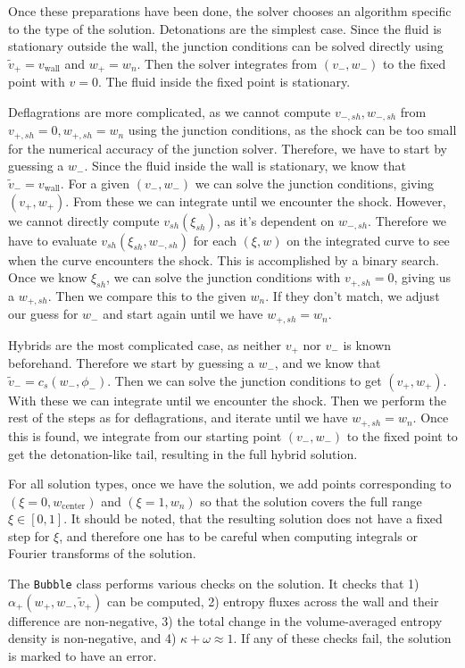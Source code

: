 Once these preparations have been done,
the solver chooses an algorithm specific to the type of the solution.
Detonations are the simplest case.
Since the fluid is stationary outside the wall,
the junction conditions can be solved directly using
$\tilde{v}_+ = v_\text{wall}$ and $w_+ = w_n$.
Then the solver integrates from $(v_-, w_-)$ to the fixed point with $v=0$.
The fluid inside the fixed point is stationary.

Deflagrations are more complicated,
as we cannot compute $v_{-,sh}, w_{-,sh}$ from $v_{+,sh}=0, w_{+,sh}=w_n$ using the junction conditions,
as the shock can be too small for the numerical accuracy of the junction solver.
Therefore, we have to start by guessing a $w_-$.
Since the fluid inside the wall is stationary, we know that $\tilde{v}_- = v_{\text{wall}}$.
For a given $(v_-, w_-)$ we can solve the junction conditions, giving $(v_+, w_+)$.
From these we can integrate until we encounter the shock.
However, we cannot directly compute $v_{sh}(\xi_{sh})$, as it's dependent on $w_{-,sh}$.
Therefore we have to evaluate $v_{sh}(\xi_{sh}, w_{-,sh})$ for each $(\xi, w)$ on the integrated curve to see
when the curve encounters the shock.
This is accomplished by a binary search.
Once we know $\xi_{sh}$, we can solve the junction conditions with $v_{+,sh} = 0$, giving us a $w_{+,sh}$.
Then we compare this to the given $w_n$.
If they don't match, we adjust our guess for $w_-$ and start again until we have $w_{+,sh} = w_n$.

Hybrids are the most complicated case, as neither $v_+$ nor $v_-$ is known beforehand.
Therefore we start by guessing a $w_-$, and we know that $\tilde{v}_- = c_s(w_-, \phi_-)$.
Then we can solve the junction conditions to get $(v_+, w_+)$.
With these we can integrate until we encounter the shock.
Then we perform the rest of the steps as for deflagrations, and iterate until we have $w_{+,sh} = w_n$.
Once this is found, we integrate from our starting point $(v_-, w_-)$ to the fixed point to get the detonation-like tail,
resulting in the full hybrid solution.

For all solution types, once we have the solution,
we add points corresponding to $(\xi=0, w_\text{center})$ and $(\xi=1, w_n)$
so that the solution covers the full range $\xi \in [0, 1]$.
It should be noted, that the resulting solution does not have a fixed step for $\xi$,
and therefore one has to be careful when computing integrals or Fourier transforms of the solution.

The \verb|Bubble| class performs various checks on the solution.
It checks that
1) $\alpha_+(w_+, w_-, \tilde{v}_+)$ can be computed,
2) entropy fluxes across the wall and their difference are non-negative,
3) the total change in the volume-averaged entropy density is non-negative, and
4) $\kappa + \omega \approx 1$.
If any of these checks fail, the solution is marked to have an error.

